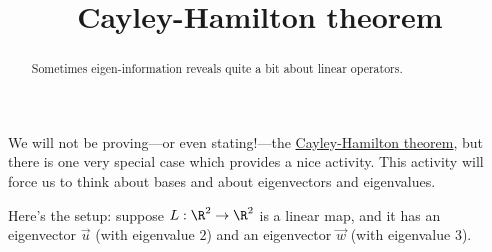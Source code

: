 \documentclass{ximera}
\title{Cayley-Hamilton theorem}
\begin{document}
\begin{abstract}
  Sometimes eigen-information reveals quite a bit about linear
  operators.
\end{abstract}\maketitle

We will not be proving---or even stating!---the
\href{http://en.wikipedia.org/wiki/Cayley–Hamilton_theorem}{Cayley-Hamilton
  theorem}, but there is one very special case which provides a nice
activity.  This activity will force us to think about bases and about
eigenvectors and eigenvalues.

Here's the setup: suppose $L : \R^2 \to \R^2$ is a linear map, and it
has an eigenvector $\vec{u}$ (with eigenvalue $2$) and an eigenvector
$\vec{w}$ (with eigenvalue $3$).
\end{document}
